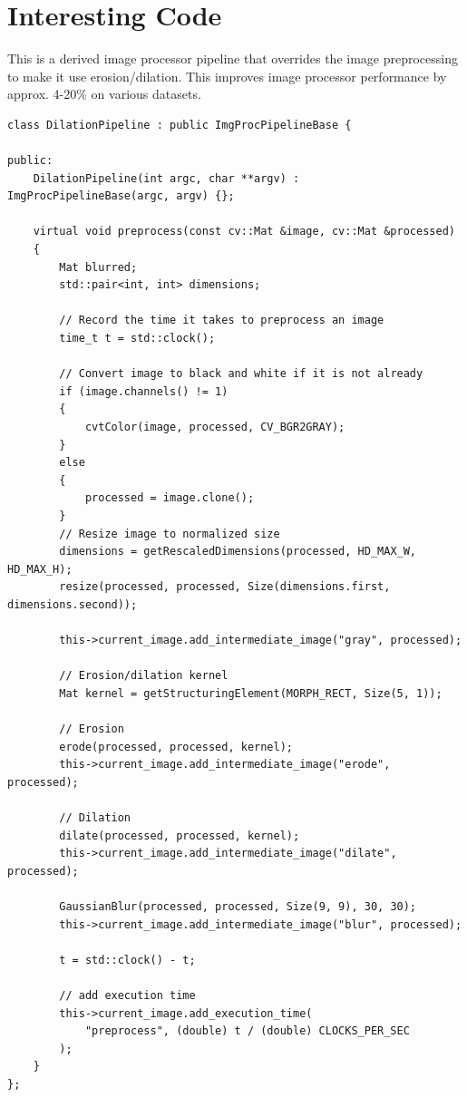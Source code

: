 \documentclass[10pt, onecolumn, draftclsnofoot, letterpaper, compsoc]{IEEEtran}
\begin{document}
\newpage
\section{Interesting Code}

This is a derived image processor pipeline that overrides the image preprocessing
to make it use erosion/dilation. This improves image processor performance by approx. 4-20\%
on various datasets. \\

\begin{verbatim}
class DilationPipeline : public ImgProcPipelineBase {

public:
    DilationPipeline(int argc, char **argv) : ImgProcPipelineBase(argc, argv) {};

    virtual void preprocess(const cv::Mat &image, cv::Mat &processed)
    {
        Mat blurred;
        std::pair<int, int> dimensions;

        // Record the time it takes to preprocess an image
        time_t t = std::clock();

        // Convert image to black and white if it is not already
        if (image.channels() != 1)
        {
            cvtColor(image, processed, CV_BGR2GRAY);
        }
        else
        {
            processed = image.clone();
        }
        // Resize image to normalized size
        dimensions = getRescaledDimensions(processed, HD_MAX_W, HD_MAX_H);
        resize(processed, processed, Size(dimensions.first, dimensions.second));

        this->current_image.add_intermediate_image("gray", processed);

        // Erosion/dilation kernel
        Mat kernel = getStructuringElement(MORPH_RECT, Size(5, 1));

        // Erosion
        erode(processed, processed, kernel);
        this->current_image.add_intermediate_image("erode", processed);

        // Dilation
        dilate(processed, processed, kernel);
        this->current_image.add_intermediate_image("dilate", processed);

        GaussianBlur(processed, processed, Size(9, 9), 30, 30);
        this->current_image.add_intermediate_image("blur", processed);

        t = std::clock() - t;

        // add execution time
        this->current_image.add_execution_time(
		    "preprocess", (double) t / (double) CLOCKS_PER_SEC
        );
    }
};
\end{verbatim}
\end{document}
